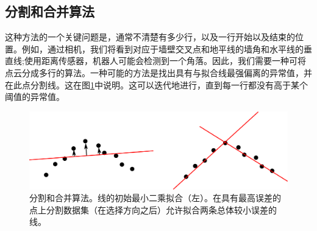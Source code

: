 
\subsection{分割和合并算法}
这种方法的一个关键问题是，通常不清楚有多少行，以及一行开始以及结束的位置。例如，通过相机，我们将看到对应于墙壁交叉点和地平线的墙角和水平线的垂直线;使用距离传感器，机器人可能会检测到一个角落。因此，我们需要一种可将点云分成多行的算法。一种可能的方法是找出具有与拟合线最强偏离的异常值，并在此点分割线。这在图\ref{fig:splitandmerge}中说明。这可以迭代地进行，直到每一行都没有高于某个阈值的异常值。


\begin{figure}
\includegraphics[width=\textwidth]{figs/splitandmerge}
\caption{
分割和合并算法。线的初始最小二乘拟合（左）。在具有最高误差的点上分割数据集（在选择方向之后）允许拟合两条总体较小误差的线。
\label{fig:splitandmerge}} 
\end{figure}

